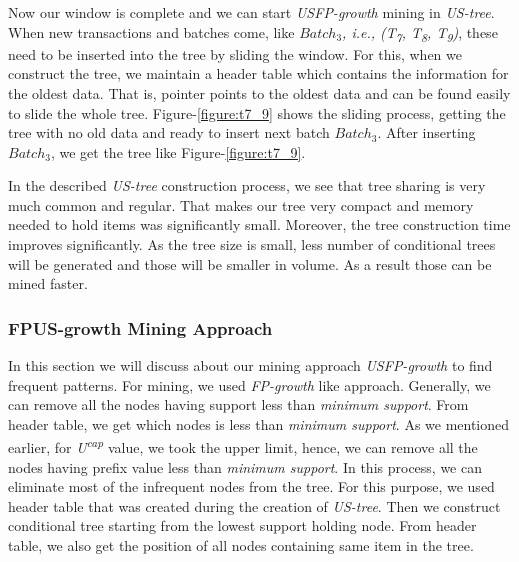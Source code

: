 \documentclass[conference]{IEEEtran}
\begin{document}
Now our window is complete and we can start \emph{USFP-growth} mining in \emph {US-tree}. When new transactions and batches come, like \emph{$Batch_{3}$, i.e., (T\textsubscript{7}, T\textsubscript{8}, T\textsubscript{9})}, these need to be inserted into the tree by sliding the window. For this, when we construct the tree, we maintain a header table which contains the information for the oldest data. That is, pointer points to the oldest data and can be found easily to slide the whole tree. Figure-\ref{figure:t7_9} shows the sliding process, getting the tree with no old data and ready to insert next batch \emph{$Batch_{3}$}. After inserting \emph{$Batch_{3}$}, we get the tree like Figure-\ref{figure:t7_9}.
  
In the described \emph{US-tree} construction process, we see that tree sharing is very much common and regular. That makes our tree very compact and memory needed to hold items was significantly small. Moreover, the tree construction time improves significantly. As the tree size is small, less number of conditional trees will be generated and those will be smaller in volume. As a result those can be mined faster.

\subsubsection{FPUS-growth Mining Approach}
In this section we will discuss about our mining approach \emph{USFP-growth} to find frequent patterns. For mining, we used \emph{FP-growth} like approach. Generally, we can remove all the nodes having support less than \emph{minimum support}. From header table, we get which nodes is less than \emph{minimum support}. As we mentioned earlier, for \emph{U\textsuperscript{cap}} value, we took the upper limit, hence, we can remove all the nodes having prefix value less than \emph{minimum support}. In this process, we can eliminate most of the infrequent nodes from the tree. For this purpose, we used header table that was created during the creation of \emph{US-tree}. Then we construct conditional tree starting from the lowest support holding node. From header table, we also get the position of all nodes containing same item in the tree.
\end{document}
